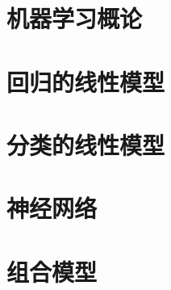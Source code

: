 \chapter{机器学习概论}





\chapter{回归的线性模型}






\chapter{分类的线性模型}





\chapter{神经网络}










\chapter{组合模型}







